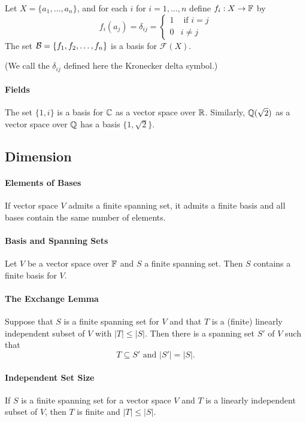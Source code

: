 Let \(X = \{a_1, \dots, a_n \}\), and for each \(i\) for \(i = 1, \dots, n\) define \(f_i : X \to \mathbb{F}\) by
\[f_i(a_j) = \delta_{ij} = \begin{cases}
    1 & \text{ if } i = j \\
    0 & i \neq j
\end{cases}\]
The set \(\mathcal{B} = \{f_1, f_2, \dots, f_n\}\) is a basis for \(\mathcal{F}(X)\). 

(We call the \(\delta_{ij}\) defined here the Kronecker delta symbol.)

\paragraph{Fields}
The set \(\{1,i\}\) is a basis for \(\mathbb{C}\) as a vector space over \(\mathbb{R}\). Similarly, \(\mathbb{Q}(\sqrt{2})\) as a vector space over \(\mathbb{Q}\) has a basis \(\{1, \sqrt{2}\}\).

\subsection{Dimension}
\paragraph{Elements of Bases}
If vector space \(V\) admits a finite spanning set, it admits a finite basis and all bases contain the same number of elements.

\paragraph{Basis and Spanning Sets}
Let \(V\) be a vector space over \(\mathbb{F}\) and \(S\) a finite spanning set. Then \(S\) contains a finite basis for \(V\).

\paragraph{The Exchange Lemma} 
Suppose that \(S\) is a finite spanning set for \(V\) and that \(T\) is a (finite) linearly independent subset of \(V\) with \(|T| \leq |S|\). Then there is a spanning set \(S'\) of \(V\) such that 
\[T \subseteq S' \text{ and } |S'| = |S|.\]

\paragraph{Independent Set Size}
If \(S\) is a finite spanning set for a vector space \(V\) and \(T\) is a linearly independent subset of \(V\), then \(T\) is finite and \(|T| \leq |S|\).

